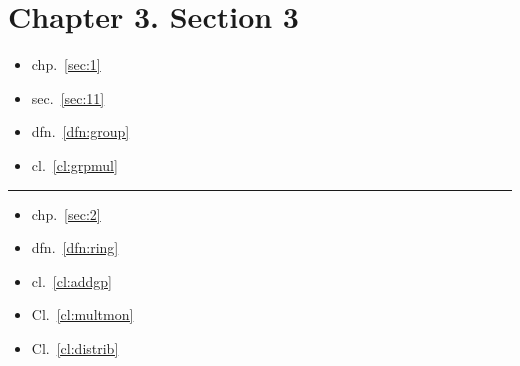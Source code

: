 \hypertarget{section-3}{%
\section{Chapter 3. Section 3}\label{section-3}}

\begin{itemize}
\tightlist
\item
  chp.~\ref{sec:1}
\item
  sec.~\ref{sec:11}
\item
  dfn.~\ref{dfn:group}
\item
  cl.~\ref{cl:grpmul}
\end{itemize}

\begin{center}\rule{0.5\linewidth}{\linethickness}\end{center}

\begin{itemize}
\tightlist
\item
  chp.~\ref{sec:2}
\item
  dfn.~\ref{dfn:ring}
\item
  cl.~\ref{cl:addgp}
\item
  Cl.~\ref{cl:multmon}
\item
  Cl.~\ref{cl:distrib}
\end{itemize}
